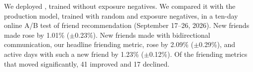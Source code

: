 We deployed \ours{}, trained without exposure negatives. We compared it with the production model,
trained with random and exposure negatives, in a ten-day online A/B test of friend recommendation (September 17--26,
2026).
New friends made rose by 1.01\% ($\pm$0.23\%). New friends made with bidirectional communication, our headline
friending metric, rose by 2.09\% ($\pm$0.29\%), and active days with such a new friend by 1.23\% ($\pm$0.12\%). Of the friending metrics that moved significantly, 41 improved and 17 declined.
